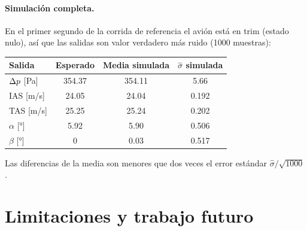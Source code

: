 \documentclass[11pt,a4paper]{article}
\begin{document}
\paragraph{Simulación completa.} En el primer segundo de la corrida de
referencia el avión está en trim (estado nulo), así que las salidas son valor
verdadero más ruido (1000 muestras):

\begin{center}
\begin{tabular}{lccc}
\toprule
Salida & Esperado & Media simulada & $\hat\sigma$ simulada \\
\midrule
$\Delta p$ [\si{Pa}]          & 354.37 & 354.11 & 5.66 \\
IAS [\si{m/s}]            & 24.05  & 24.04  & 0.192 \\
TAS [\si{m/s}]            & 25.25  & 25.24  & 0.202 \\
$\alpha$ [\si{\degree}]   & 5.92   & 5.90   & 0.506 \\
$\beta$ [\si{\degree}]    & 0      & 0.03   & 0.517 \\
\bottomrule
\end{tabular}
\end{center}

Las diferencias de la media son menores que dos veces el error estándar
$\hat\sigma/\sqrt{1000}$.

\section{Limitaciones y trabajo futuro}
\label{sec:limitaciones}
\end{document}

